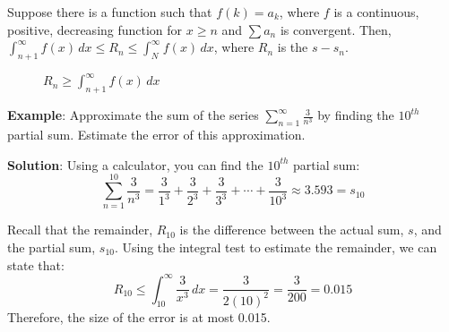 Suppose there is a function such that $f(k) = a_k$, where $f$ is a continuous, 
positive, decreasing function for $x \geq n$ and $\sum a_n$ is convergent. 
Then, $\int_{n+1}^\infty f(x)\,dx \leq R_n \leq \int_N^\infty f(x)\,dx$, where 
$R_n$ is the $s - s_n$. 

\begin{figure}[htbp]
    \centering
    \caption{$R_n \geq \int_{n+1}^\infty f(x)\,dx$ }
    \label{fig:remainderfloor}
\end{figure}

\textbf{Example}: Approximate the sum of the series $\sum_{n=1}^\infty 
\frac{3}{n^3}$ by finding the $10^{th}$ partial sum. Estimate the error of 
this approximation. 

\textbf{Solution}: Using a calculator, you can find the $10^{th}$ partial sum: 
$$\sum_{n=1}^{10} \frac{3}{n^3} = \frac{3}{1^3} + \frac{3}{2^3} + 
\frac{3}{3^3} + \cdots + \frac{3}{10^3} \approx 3.593 = s_{10}$$

Recall that the remainder, $R_{10}$ is the difference between the actual sum, 
$s$, and the partial sum, $s_{10}$. Using the integral test to estimate the 
remainder, we can state that: $$R_{10} \leq \int_{10}^\infty \frac{3}{x^3}\,dx 
= \frac{3}{2(10)^2} = \frac{3}{200} = 0.015$$ Therefore, the size of the error 
is at most 0.015. 

